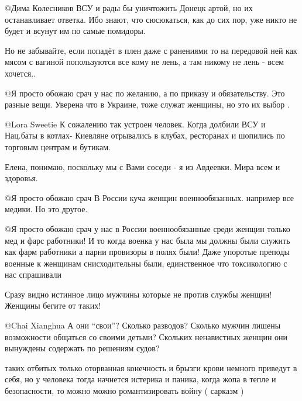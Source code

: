 \begin{itemize}

@Дима Колесников  ВСУ и рады бы уничтожить Донецк артой, но их останавливает
ответка. Ибо знают, что сюсюкаться, как до сих пор, уже никто не будет и
всунут им по самые помидоры.


Но не забывайте, если попадёт в плен  даже с ранениями то на передовой ней как
мясом с вагиной попользуются все кому не лень, а там никому не лень - всем
хочется..


 @Я просто обожаю срач  у нас по желанию, а по приказу  и обязательству. Это
 разные вещи. Уверена что в Украине, тоже служат женщины, но это их выбор .


@Lora Sweetie  К сожалению так устроен человек. Когда долбили ВСУ и Нац.баты в
котлах-  Киевляне отрывались в клубах, ресторанах и шопились по торговым
центрам и бутикам.


Елена, понимаю, поскольку мы с Вами соседи - я из Авдеевки. Мира всем и здоровья. 


@Я просто обожаю срач  В России куча женщин военнообязанных. например все медики. Но это другое.


@Я просто обожаю срач  у нас в России военнообязанные среди женщин только мед
и фарс работники! И то когда военка у нас была мы должны были служить как фарм
работники а парни провизоры в полях были! Даже упоротые преподы военные к
женщинам снисходительны были, единственное что токсикологию с нас спрашивали

Сразу видно истинное лицо мужчины которые не против службы женщин! Женщины бегите от таких!


@Chai Xianghua  А они \enquote{свои}? Сколько разводов? Сколько мужчин лишены
возможности общаться со своими детьми? Скольких ненавистных женщин они
вынуждены содержать по решениям судов?


таких отбитых только оторванная конечность и брызги крови немного приведут в
себя, но у человека тогда начнется истерика и паника, когда жопа в тепле и
безопасности, то можно можно романтизировать войну ( сарказм ) 


\end{itemize}
